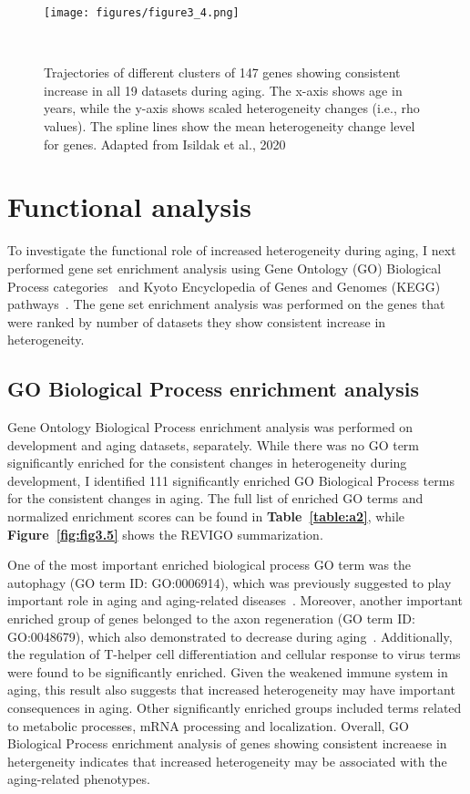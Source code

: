 \begin{figure}[h]
    \centering
    \texttt{[image: figures/figure3\_4.png]}
    \caption{Trajectories of different clusters of 147 genes showing consistent increase in all 19 datasets during aging.
    The x-axis shows age in years, while the y-axis shows scaled heterogeneity changes (i.e., rho values).
    The spline lines show the mean heterogeneity change level for genes. 
    Adapted from Isildak et al., 2020
    }~\label{fig:fig3.4}
\end{figure}

\section{Functional analysis}
To investigate the functional role of increased heterogeneity during aging, 
I next performed gene set enrichment analysis using Gene Ontology (GO) Biological Process categories~\cite{GO2019} and Kyoto Encyclopedia of Genes and Genomes (KEGG) pathways~\cite{Kanehisa2019}.
The gene set enrichment analysis was performed on the genes that were ranked by number of datasets they show consistent increase in heterogeneity. 

\subsection{GO Biological Process enrichment analysis}
Gene Ontology Biological Process enrichment analysis was performed on development and aging datasets, separately. 
While there was no GO term significantly enriched for the consistent changes in heterogeneity during development, 
I identified 111 significantly enriched GO Biological Process terms for the consistent changes in aging. 
The full list of enriched GO terms and normalized enrichment scores can be found in \textbf{Table~\ref{table:a2}}, 
while \textbf{Figure~\ref{fig:fig3.5}} shows the REVIGO summarization.

One of the most important enriched biological process GO term was the autophagy (GO term ID: GO:0006914), which was previously suggested to play important role in aging and aging-related diseases~\cite{Luo2019}.
Moreover, another important enriched group of genes belonged to the axon regeneration (GO term ID: GO:0048679), which also demonstrated to decrease during aging~\cite{Belin2014}.
Additionally, the regulation of T-helper cell differentiation and cellular response to virus terms were found to be significantly enriched. 
Given the weakened immune system in aging, this result also suggests that increased heterogeneity may have important consequences in aging.
Other significantly enriched groups included terms related to metabolic processes, mRNA processing and localization.
Overall, GO Biological Process enrichment analysis of genes showing consistent increaese in hetergeneity indicates that increased heterogeneity may be associated with the aging-related phenotypes.


